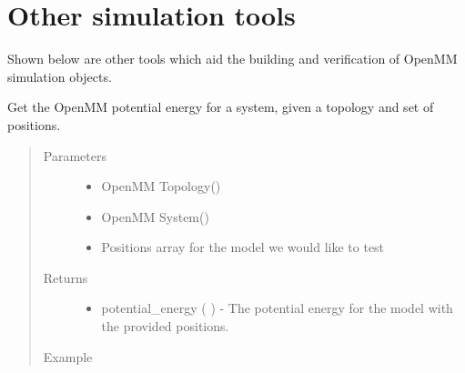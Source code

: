 \documentclass[letterpaper,12pt,english,openany,oneside]{sphinxmanual}
\begin{document}
\newpage


\section{Other simulation tools}
\label{\detokenize{simulation:other-simulation-tools}}
Shown below are other tools which aid the building and verification of OpenMM simulation objects.

\label{\detokenize{simulation:module-simulation.tools}}

\begin{fulllineitems}
\label{\detokenize{simulation:simulation.tools.get_mm_energy}}
Get the OpenMM potential energy for a system, given a topology and set of positions.
\begin{quote}\begin{description}
\item[{Parameters}] \leavevmode\begin{itemize}
\item {} 
 \textendash{} OpenMM Topology()

\item {} 
 \textendash{} OpenMM System()

\item {} 
 \textendash{} Positions array for the model we would like to test

\end{itemize}

\item[{Returns}] \leavevmode
\begin{itemize}
\item {} 
potential\_energy (  ) - The potential energy for the model with the provided positions.

\end{itemize}


\item[{Example}] \leavevmode
\end{description}\end{quote}


\end{fulllineitems}
\end{document}
